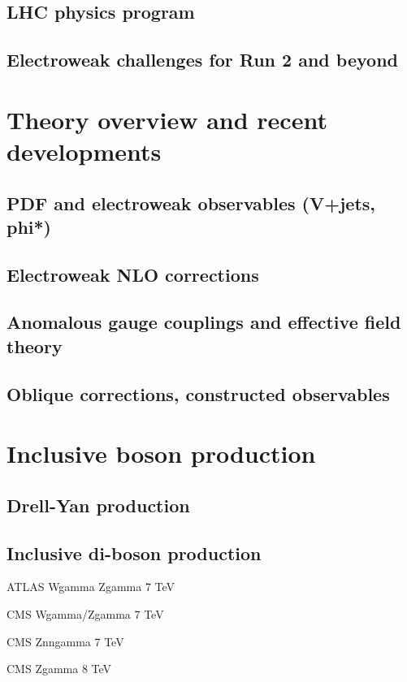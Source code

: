 \documentclass[12pt]{iopart}
\begin{document}
\subsection{LHC physics program}
\subsection{Electroweak challenges for Run 2 and beyond}

\section{Theory overview and recent developments}
\subsection{PDF and electroweak observables (V+jets, phi*)}
\subsection{Electroweak NLO corrections}
\subsection{Anomalous gauge couplings and effective field theory}
\subsection{Oblique corrections, constructed observables}


\section{Inclusive boson production}
\subsection{Drell-Yan production}
\label{ss-inclboson-drellyan}

\subsection{Inclusive di-boson production}

ATLAS Wgamma Zgamma 7 TeV~\cite{Aad:2013izg}

CMS Wgamma/Zgamma 7 TeV~\cite{Chatrchyan:2013fya}

CMS Znngamma 7 TeV~\cite{Chatrchyan:2013nda}

CMS Zgamma 8 TeV~\cite{Khachatryan:2015kea}
\end{document}

